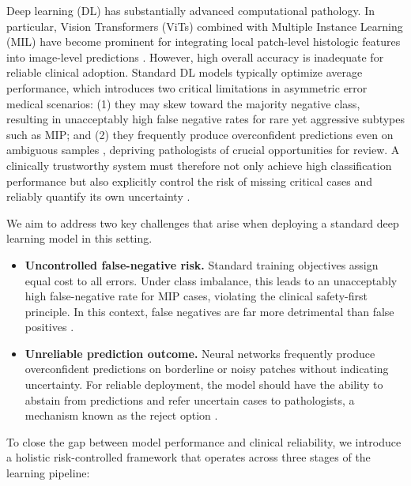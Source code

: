 \documentclass[journal,twoside,web]{ieeecolor}
\begin{document}
Deep learning (DL) has substantially advanced computational pathology. In particular, Vision Transformers (ViTs) \cite{dosovitskiy2020image} combined with Multiple Instance Learning (MIL) \cite{ilse2018attention} have become prominent for integrating local patch-level histologic features into image-level predictions \cite{campanella2019clinical, lu2021data, ilse2018attention,an2024transformer}. However, high overall accuracy is inadequate for reliable clinical adoption. Standard DL models typically optimize average performance, which introduces two critical limitations in asymmetric error medical scenarios: (1) they may skew toward the majority negative class, resulting in unacceptably high false negative rates for rare yet aggressive subtypes such as MIP; and (2) they frequently produce overconfident predictions even on ambiguous samples \cite{hendrycks2016baseline}, depriving pathologists of crucial opportunities for review. A clinically trustworthy system must therefore not only achieve high classification performance but also explicitly control the risk of missing critical cases and reliably quantify its own uncertainty \cite{dvijotham2023enhancing}.

We aim to address two key challenges that arise when deploying a standard deep learning model in this setting.
\begin{itemize}
    \item \textbf{Uncontrolled false-negative risk.} Standard training objectives assign equal cost to all errors. Under class imbalance, this leads to an unacceptably high false-negative rate for MIP cases, violating the clinical safety-first principle. In this context, false negatives are far more detrimental than false positives \cite{he2009learning}.

    \item \textbf{Unreliable prediction outcome.} Neural networks frequently produce overconfident predictions on borderline or noisy patches without indicating uncertainty. For reliable deployment, the model should have the ability to abstain from predictions and refer uncertain cases to pathologists, a mechanism known as the reject option \cite{leibig2022combining}.
\end{itemize}

To close the gap between model performance and clinical reliability, we introduce a holistic risk-controlled framework that operates across three stages of the learning pipeline:
\end{document}
